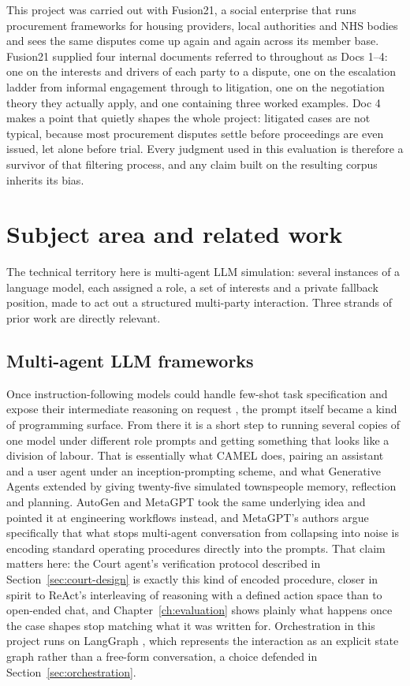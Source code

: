 This project was carried out with Fusion21, a social enterprise that runs
procurement frameworks for housing providers, local authorities and NHS bodies
and sees the same disputes come up again and again across its member base.
Fusion21 supplied four internal documents referred to throughout as Docs 1--4:
one on the interests and drivers of each party to a dispute, one on the
escalation ladder from informal engagement through to litigation, one on the
negotiation theory they actually apply, and one containing three worked
examples. Doc 4 makes a point that quietly shapes the whole project: litigated
cases are not typical, because most procurement disputes settle before
proceedings are even issued, let alone before trial. Every judgment used in this
evaluation is therefore a survivor of that filtering process, and any claim
built on the resulting corpus inherits its bias.

\section{Subject area and related work}
\label{sec:related}

The technical territory here is multi-agent LLM simulation: several instances of
a language model, each assigned a role, a set of interests and a private
fallback position, made to act out a structured multi-party interaction. Three
strands of prior work are directly relevant.

\subsection*{Multi-agent LLM frameworks}

Once instruction-following models could handle few-shot task specification
\cite{brown2020language} and expose their intermediate reasoning on request
\cite{wei2022chain}, the prompt itself became a kind of programming surface. From
there it is a short step to running several copies of one model under different
role prompts and getting something that looks like a division of labour. That
is essentially what CAMEL \cite{li2023camel} does, pairing an assistant and a
user agent under an inception-prompting scheme, and what Generative Agents
\cite{park2023generative} extended by giving twenty-five simulated townspeople
memory, reflection and planning. AutoGen \cite{wu2023autogen} and MetaGPT
\cite{hong2024metagpt} took the same underlying idea and pointed it at
engineering workflows instead, and MetaGPT's authors argue specifically that
what stops multi-agent conversation from collapsing into noise is encoding
standard operating procedures directly into the prompts. That claim matters
here: the Court agent's verification protocol described in
Section~\ref{sec:court-design} is exactly this kind of encoded procedure, closer
in spirit to ReAct's interleaving of reasoning with a defined action space
\cite{yao2023react} than to open-ended chat, and Chapter~\ref{ch:evaluation}
shows plainly what happens once the case shapes stop matching what it was
written for. Orchestration in this project runs on LangGraph \cite{langgraph},
which represents the interaction as an explicit state graph rather than a
free-form conversation, a choice defended in Section~\ref{sec:orchestration}.

